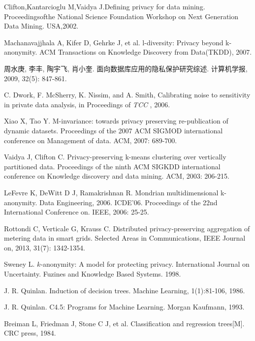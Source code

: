 \begin{thebibliography}{1}

Clifton,Kantarcioglu M,Vaidya J.Defining privacy for data mining. Proceedingsofthe National Science Foundation Workshop on Next Generation Data Mining. USA,2002.

Machanavajjhala A, Kifer D, Gehrke J, et al. l-diversity: Privacy beyond k-anonymity. ACM Transactions on Knowledge Discovery from Data(TKDD), 2007.

周水庚, 李丰, 陶宇飞, 肖小奎. 面向数据库应用的隐私保护研究综述. 计算机学报, 2009, 32(5): 847-861. 

C. Dwork, F. McSherry, K. Nissim, and A. Smith, Calibrating noise to sensitivity in private data analysis, in Proceedings of {\it TCC }, 2006.

Xiao X, Tao Y. M-invariance: towards privacy preserving re-publication of dynamic datasets. Proceedings of the 2007 ACM SIGMOD international conference on Management of data. ACM, 2007: 689-700.

Vaidya J, Clifton C. Privacy-preserving k-means clustering over vertically partitioned data. Proceedings of the ninth ACM SIGKDD international conference on Knowledge discovery and data mining. ACM, 2003: 206-215.

LeFevre K, DeWitt D J, Ramakrishnan R. Mondrian multidimensional k-anonymity. Data Engineering, 2006. ICDE'06. Proceedings of the 22nd International Conference on. IEEE, 2006: 25-25.

Rottondi C, Verticale G, Krauss C. Distributed privacy-preserving aggregation of metering data in smart grids. Selected Areas in Communications, IEEE Journal on, 2013, 31(7): 1342-1354.

 Sweney L. $k$-anonymity: A model for protecting privacy. International Journal on Uncertainty. Fuzines and Knowledge Based Systems. 1998.

J. R. Quinlan. Induction of decision trees. Machine Learning, 1(1):81-106, 1986.

J. R. Quinlan. C4.5: Programs for Machine Learning. Morgan Kaufmann, 1993.

Breiman L, Friedman J, Stone C J, et al. Classification and regression trees[M]. CRC press, 1984.


\end{thebibliography}
